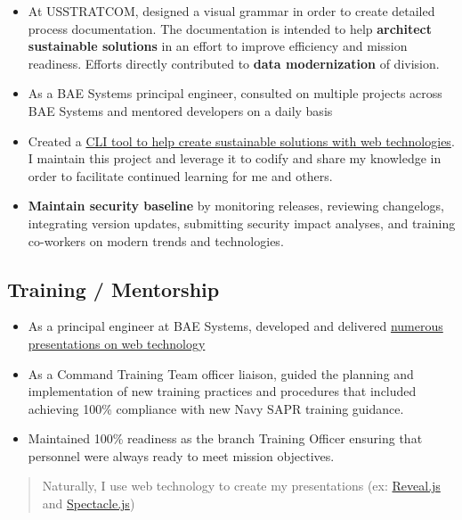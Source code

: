 \documentclass[10pt]{article}
\def\tightlist{}
\begin{document}
\begin{itemize}
\tightlist
\item
  At USSTRATCOM, designed a visual grammar in order to create detailed
  process documentation. The documentation is intended to help
  \textbf{architect sustainable solutions} in an effort to improve
  efficiency and mission readiness. Efforts directly contributed to
  \textbf{data modernization} of division.
\item
  As a BAE Systems principal engineer, consulted on multiple projects
  across BAE Systems and mentored developers on a daily basis
\item
  Created a \href{https://github.com/jhwohlgemuth/tomo-cli}{CLI tool to
  help create sustainable solutions with web technologies}. I maintain
  this project and leverage it to codify and share my knowledge in order
  to facilitate continued learning for me and others.
\item
  \textbf{Maintain security baseline} by monitoring releases, reviewing
  changelogs, integrating version updates, submitting security impact
  analyses, and training co-workers on modern trends and technologies.
\end{itemize}

\hypertarget{training-mentorship}{%
\subsection{Training / Mentorship}\label{training-mentorship}}

\begin{itemize}
\tightlist
\item
  As a principal engineer at BAE Systems, developed and delivered
  \href{https://github.com/jhwohlgemuth?utf8=\%E2\%9C\%93\&tab=repositories\&q=slides\&type=source\&language=}{numerous
  presentations on web technology}
\item
  As a Command Training Team officer liaison, guided the planning and
  implementation of new training practices and procedures that included
  achieving 100\% compliance with new Navy SAPR training guidance.
\item
  Maintained 100\% readiness as the branch Training Officer ensuring
  that personnel were always ready to meet mission objectives.
\end{itemize}

\begin{quote}
Naturally, I use web technology to create my presentations (ex:
\href{https://revealjs.com/\#/}{Reveal.js} and
\href{https://formidable.com/open-source/spectacle/}{Spectacle.js})
\end{quote}
\end{document}
